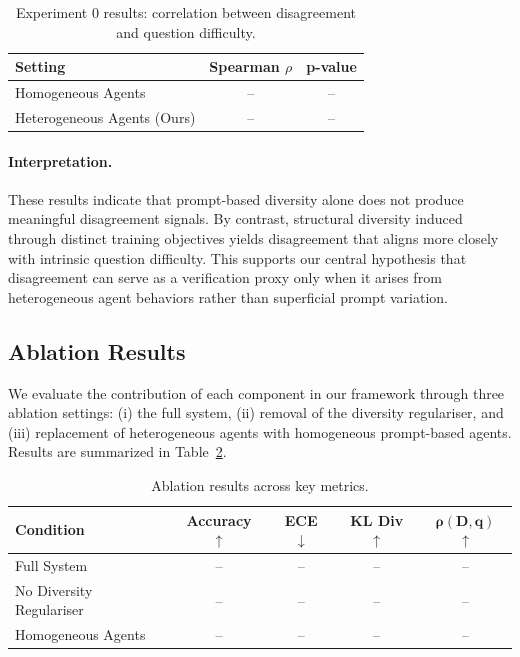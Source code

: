 \documentclass{article}
\begin{document}
\begin{table}[h]
\centering
\caption{Experiment 0 results: correlation between disagreement and question difficulty.}
\label{tab:exp0_comparison_results}
\begin{tabular}{lcc}
\toprule
\textbf{Setting} & \textbf{Spearman $\rho$} & \textbf{p-value} \\
\midrule
Homogeneous Agents & -- & -- \\
Heterogeneous Agents (Ours) & -- & -- \\
\bottomrule
\end{tabular}
\end{table}

\paragraph{Interpretation.}
These results indicate that prompt-based diversity alone does not produce meaningful disagreement signals. By contrast, structural diversity induced through distinct training objectives yields disagreement that aligns more closely with intrinsic question difficulty. This supports our central hypothesis that disagreement can serve as a verification proxy only when it arises from heterogeneous agent behaviors rather than superficial prompt variation.

\subsection{Ablation Results}

We evaluate the contribution of each component in our framework through three ablation settings: (i) the full system, (ii) removal of the diversity regulariser, and (iii) replacement of heterogeneous agents with homogeneous prompt-based agents. Results are summarized in Table~\ref{tab:ablation_results}.

\begin{table}[h]
\centering
\caption{Ablation results across key metrics.}
\label{tab:ablation_results}
\begin{tabular}{lcccc}
\toprule
\textbf{Condition} & \textbf{Accuracy} $\uparrow$ & \textbf{ECE} $\downarrow$ & \textbf{KL Div} $\uparrow$ & $\boldsymbol{\rho(D,q)}$ $\uparrow$ \\
\midrule
Full System & -- & -- & -- & -- \\
No Diversity Regulariser & -- & -- & -- & -- \\
Homogeneous Agents & -- & -- & -- & -- \\
\bottomrule
\end{tabular}
\end{table}
\end{document}
